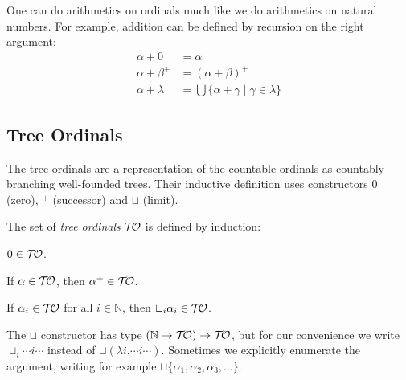 
One can do arithmetics on ordinals much like we do arithmetics on natural
numbers. For example, addition can be defined by recursion on the right
argument:
\begin{align*}
  \alpha + 0       &= \alpha\\
  \alpha + \beta^+ &= (\alpha + \beta)^+\\
  \alpha + \lambda &= \bigcup \{ \alpha + \gamma \; | \; \gamma \in \lambda \}
\end{align*}


\subsection{Tree Ordinals}\label{sub:tree}



%

The tree ordinals \citep{dennis-jones-wainer-84} are a representation
of the countable ordinals as countably branching well-founded
trees. Their inductive definition uses constructors $0$ (zero), $^+$
(successor) and $\sqcup$ (limit).

\begin{definition}\label{def:ordinals}%
The set of \emph{tree ordinals} $\mathcal{T\!O}$ is defined by induction:
\begin{compactenum}
  \item
    $0 \in \mathcal{T\!O}$.
  \item
    If $\alpha \in \mathcal{T\!O}$, then $\alpha^+ \in \mathcal{T\!O}$.
  \item
    If $\alpha_i \in \mathcal{T\!O}$ for all $i \in \mathbb{N}$, then $\sqcup_i
    \alpha_i \in \mathcal{T\!O}$.
\end{compactenum}
\end{definition}
The $\sqcup$ constructor has type $(\mathbb{N} \rightarrow \mathcal{T\!O}) \rightarrow
\mathcal{T\!O}$, but for our convenience we write $\sqcup_i \cdots i \cdots$ instead
of $\sqcup (\lambda i . \cdots i \cdots)$. Sometimes we explicitly enumerate
the argument, writing for example $\sqcup \{ \alpha_1, \alpha_2,
\alpha_3, \ldots \}$.


